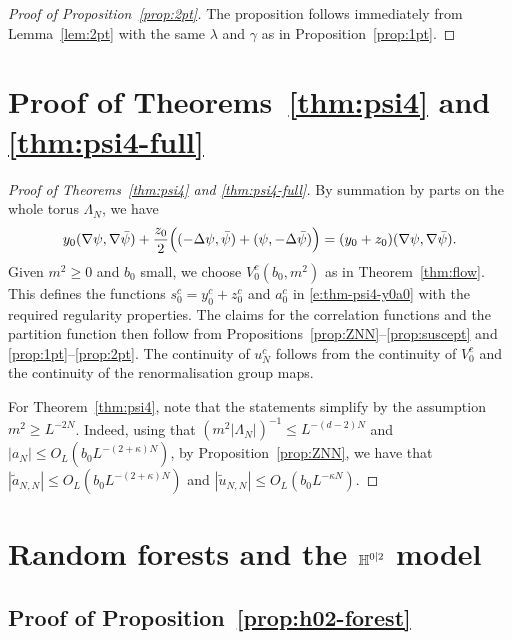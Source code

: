 \documentclass[11pt]{amsart}
\numberwithin{equation}{section}
\numberwithin{theorem}{section}
\newcommand{\1}{{\bf 1}}
\newcommand{\OL}{O_L}
\newcommand{\clambda}{\lambda}
\newcommand{\cgamma}{\gamma}
\begin{document}
\begin{proof}[Proof of Proposition~\ref{prop:2pt}]
  The proposition follows immediately from Lemma~\ref{lem:2pt} with the same $\clambda$ and $\cgamma$
  as in Proposition~\ref{prop:1pt}.
\end{proof}



\section{Proof of Theorems~\ref{thm:psi4} and \ref{thm:psi4-full}}
\label{sec:proofs}

\begin{proof}[Proof of Theorems~\ref{thm:psi4} and \ref{thm:psi4-full}]
  By summation by parts on the whole torus $\Lambda_N$, we have
  \begin{equation}
    y_0(\nabla \psi,\nabla\bar\psi)     + \frac{z_0}{2}\Bigl({ (-\Delta\psi,\bar\psi)+(\psi,-\Delta\bar\psi) }\Bigr)
    = (y_0+z_0) (\nabla \psi,\nabla\bar\psi).
  \end{equation}
  Given $m^2\geq 0$ and $b_0$ small, we choose $V_0^c(b_0,m^2)$ as in Theorem~\ref{thm:flow}.
  This defines the functions $s_0^c = y_0^c+z_0^c$ and $a_0^c$ in \eqref{e:thm-psi4-y0a0} with the required regularity properties.
  The claims for the correlation functions and the partition function then follow from
  Propositions~\ref{prop:ZNN}--\ref{prop:suscept} and
  \ref{prop:1pt}--\ref{prop:2pt}. The continuity of $u_{N}^c$
  follows from the continuity of $V_{0}^{c}$ and the continuity of
  the renormalisation group maps.
  
  For Theorem~\ref{thm:psi4}, note that the statements simplify by the
  assumption $m^2 \geq L^{-2N}$. Indeed, using that
  $(m^{2}|\Lambda_N|)^{-1} \leq L^{-(d-2)N}$ and
  $|a_N| \leq \OL(b_0L^{-(2+\kappa)N})$, by
  Proposition~\ref{prop:ZNN}, we have that
  $|\tilde a_{N,N}|\leq \OL(b_0L^{-(2+\kappa)N})$ and
  $|\tilde u_{N,N}| \leq \OL(b_0L^{-\kappa N})$.
\end{proof}







\appendix
\section{Random forests and the $\mathbb{H}^{0|2}$ model}
\label{app:h02forest}

\subsection{Proof of Proposition~\ref{prop:h02-forest}}
\end{document}
